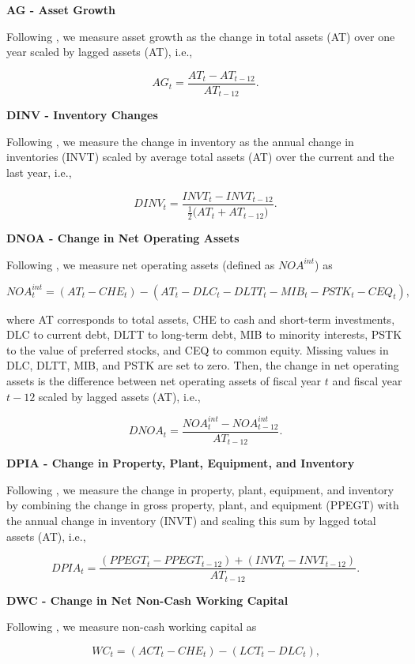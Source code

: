 \documentclass[
  article]{jss}
\begin{document}
\textbf{AG - Asset Growth}

Following \citet{cooper.2008}, we measure asset growth as the change in
total assets (AT) over one year scaled by lagged assets (AT), i.e.,

\[
AG_{t} = \frac{AT_{t} - AT_{t-12}}{AT_{t-12}}\text{.}
\]

\textbf{DINV - Inventory Changes}

Following \citet{thomas.2002}, we measure the change in inventory as the
annual change in inventories (INVT) scaled by average total assets (AT)
over the current and the last year, i.e.,

\[
DINV_{t} = \frac{INVT_{t} - INVT_{t-12}}{\frac{1}{2} \big(AT_{t} + AT_{t-12} \big)}\text{.}
\]

\textbf{DNOA - Change in Net Operating Assets}

Following \citet{hirshleifer.2004}, we measure net operating assets
(defined as \(NOA^{int}\)) as

\[
NOA^{int}_{t} = (AT_{t} - CHE_{t}) - (AT_{t} - DLC_{t} - DLTT_{t} - MIB_{t} - PSTK_{t} - CEQ_{t})\text{,}
\]

where AT corresponds to total assets, CHE to cash and short-term
investments, DLC to current debt, DLTT to long-term debt, MIB to
minority interests, PSTK to the value of preferred stocks, and CEQ to
common equity. Missing values in DLC, DLTT, MIB, and PSTK are set to
zero. Then, the change in net operating assets is the difference between
net operating assets of fiscal year \(t\) and fiscal year \(t-12\)
scaled by lagged assets (AT), i.e.,

\[
DNOA_{t} = \frac{NOA^{int}_{t} - NOA^{int}_{t-12}}{AT_{t-12}}\text{.}
\]

\textbf{DPIA - Change in Property, Plant, Equipment, and Inventory}

Following \citet{lyandres.2008}, we measure the change in property,
plant, equipment, and inventory by combining the change in gross
property, plant, and equipment (PPEGT) with the annual change in
inventory (INVT) and scaling this sum by lagged total assets (AT), i.e.,

\[
DPIA_{t} = \frac{(PPEGT_{t} - PPEGT_{t-12}) + (INVT_{t} - INVT_{t-12})}{AT_{t-12}}\text{.}
\]

\textbf{DWC - Change in Net Non-Cash Working Capital}

Following \citet{richardson.2005}, we measure non-cash working capital
as

\[
WC_{t} = (ACT_{t} - CHE_{t}) - (LCT_{t} - DLC_{t})\text{,}
\]
\end{document}
